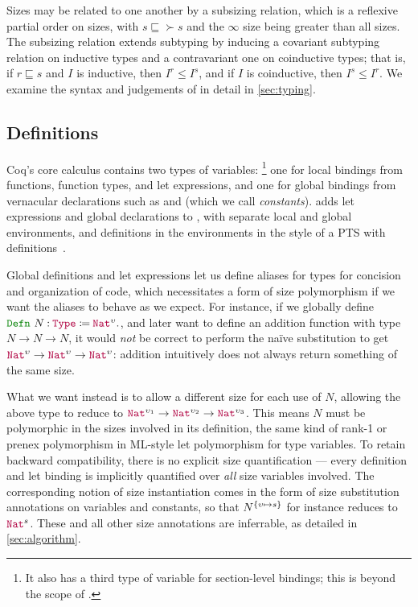Sizes may be related to one another by a subsizing relation, which is a reflexive partial order on sizes,
with $s \sqsubseteq \succ{s}$ and the $\infty$ size being greater than all sizes.
The subsizing relation extends subtyping by inducing a covariant subtyping relation on inductive types and a contravariant one on coinductive types; that is,
if $r \sqsubseteq s$ and $I$ is inductive, then $I^r \leq I^s$,
and if $I$ is coinductive, then $I^s \leq I^r$.
We examine the syntax and judgements of \lang in detail in \autoref{sec:typing}.

\subsection{Definitions}

Coq's core calculus contains two types of variables:%
\footnote{It also has a third type of variable for section-level bindings;
this is beyond the scope of \lang.}
one for local bindings from functions, function types, and let expressions,
and one for global bindings from vernacular declarations such as  and  (which we call \textit{constants}).
\lang adds let expressions and global declarations to \CIChatminus,
with separate local and global environments,
and definitions in the environments in the style of a PTS with definitions~\citep[233--241]{pts}.

Global definitions and let expressions let us define aliases for types for concision and organization of code,
which necessitates a form of size polymorphism if we want the aliases to behave as we expect.
For instance, if we globally define $\Defn{N}{\Type{}}{\Nat^\upsilon}$,
and later want to define an addition function with type $N \rightarrow N \rightarrow N$,
it would \emph{not} be correct to perform the na\"ive substitution to get $\Nat^\upsilon \rightarrow \Nat^\upsilon \rightarrow \Nat^\upsilon$:
addition intuitively does not always return something of the same size.

What we want instead is to allow a different size for each use of $N$,
allowing the above type to reduce to $\Nat^{\upsilon_1} \rightarrow \Nat^{\upsilon_2} \rightarrow \Nat^{\upsilon_3}$.
This means $N$ must be polymorphic in the sizes involved in its definition,
the same kind of rank-1 or prenex polymorphism in ML-style let polymorphism for type variables.
To retain backward compatibility, there is no explicit size quantification ---
every definition and let binding is implicitly quantified over \emph{all} size variables involved.
The corresponding notion of size instantiation comes in the form of size substitution annotations on variables and constants, so that $N^{\{\upsilon \mapsto s\}}$ for instance reduces to $\Nat^s$.
These and all other size annotations are inferrable, as detailed in \autoref{sec:algorithm}.

